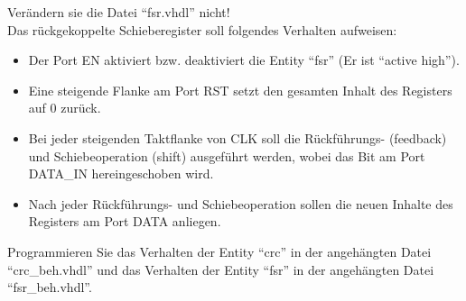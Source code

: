\documentclass[a4paper,12pt]{article}
\begin{document}
\begin{center}
\end{center}

Ver\"andern sie die Datei "`fsr.vhdl"' nicht!
\\

Das r\"uckgekoppelte Schieberegister soll folgendes Verhalten aufweisen:
\begin{itemize}
    \item Der Port EN aktiviert bzw. deaktiviert die Entity "`fsr"' (Er ist "`active high"').
    \item Eine steigende Flanke am Port RST setzt den gesamten Inhalt des Registers auf 0 zur\"uck.
    \item Bei jeder steigenden Taktflanke von CLK soll die R\"uckf\"uhrungs- (feedback) und Schiebeoperation (shift) ausgef\"uhrt werden, wobei das Bit am Port DATA\_IN hereingeschoben wird.
    \item  Nach jeder R\"uckf\"uhrungs- und Schiebeoperation sollen die neuen Inhalte des Registers am Port DATA anliegen.
\end{itemize}


Programmieren Sie das Verhalten der Entity "`crc"' in der angeh\"angten Datei "`crc\_beh.vhdl"' und das Verhalten der Entity "`fsr"' in der angeh\"angten Datei "`fsr\_beh.vhdl"'.\\
\\
\end{document}

